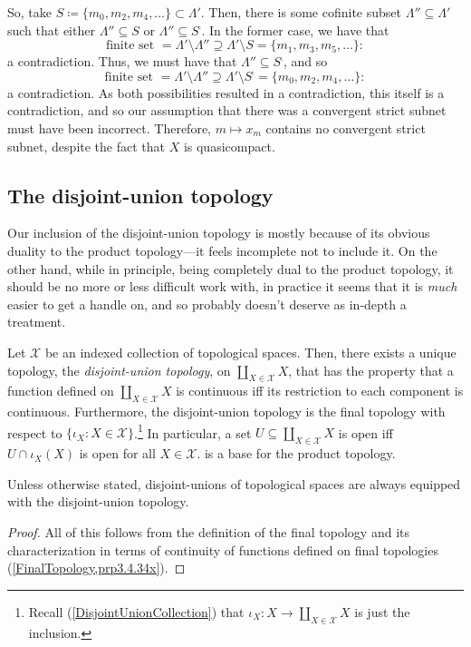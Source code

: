 \begin{exm}
So, take $S\coloneqq \{ m_0,m_2,m_4,\ldots \} \subset \Lambda '$.  Then, there is some cofinite subset $\Lambda ''\subseteq \Lambda '$ such that either $\Lambda ''\subseteq S$ or $\Lambda ''\subseteq S^{\comp}$.  In the former case, we have that
\begin{equation}
\text{finite set }=\Lambda '\setminus \Lambda '' \supseteq \Lambda '\setminus S=\{ m_1,m_3,m_5,\ldots \} :
\end{equation}
a contradiction.  Thus, we must have that $\Lambda ''\subseteq S^{\comp}$, and so
\begin{equation}
\text{finite set }=\Lambda '\setminus \Lambda ''\supseteq \Lambda '\setminus S^{\comp}=\{ m_0,m_2,m_4,\ldots \} :
\end{equation}
a contradiction.  As both possibilities resulted in a contradiction, this itself is a contradiction, and so our assumption that there was a convergent strict subnet must have been incorrect.  Therefore, $m\mapsto x_m$ contains no convergent strict subnet, despite the fact that $X$ is quasicompact.
\end{exm}

\subsection{The disjoint-union topology}

Our inclusion of the disjoint-union topology is mostly because of its obvious duality to the product topology---it feels incomplete not to include it.  On the other hand, while in principle, being completely dual to the product topology, it should be no more or less difficult work with, in practice it seems that it is \emph{much} easier to get a handle on, and so probably doesn't deserve as in-depth a treatment.
\begin{prp}\label{DisjointUnionTopology}
Let $\mathcal{X}$ be an indexed collection of topological spaces.  Then, there exists a unique topology, the \emph{disjoint-union topology}, on $\coprod _{X\in \mathcal{X}}X$, that has the property that a function defined on $\coprod _{X\in \mathcal{X}}X$ is continuous iff its restriction to each component is continuous.  Furthermore, the disjoint-union topology is the final topology with respect to $\{ \iota _X:X\in \mathcal{X}\}$.\footnote{Recall (\cref{DisjointUnionCollection}) that $\iota _X:X\rightarrow \coprod _{X\in \mathcal{X}}X$ is just the inclusion.}  In particular, a set $U\subseteq \coprod _{X\in \mathcal{X}}X$ is open iff $U\cap \iota _X(X)$ is open for all $X\in \mathcal{X}$.
is a base for the product topology.
\begin{rmk}
Unless otherwise stated, disjoint-unions of topological spaces are always equipped with the disjoint-union topology.
\end{rmk}
\begin{proof}
All of this follows from the definition of the final topology and its characterization in terms of continuity of functions defined on final topologies (\cref{FinalTopology,prp3.4.34x}).
\end{proof}
\end{prp}

